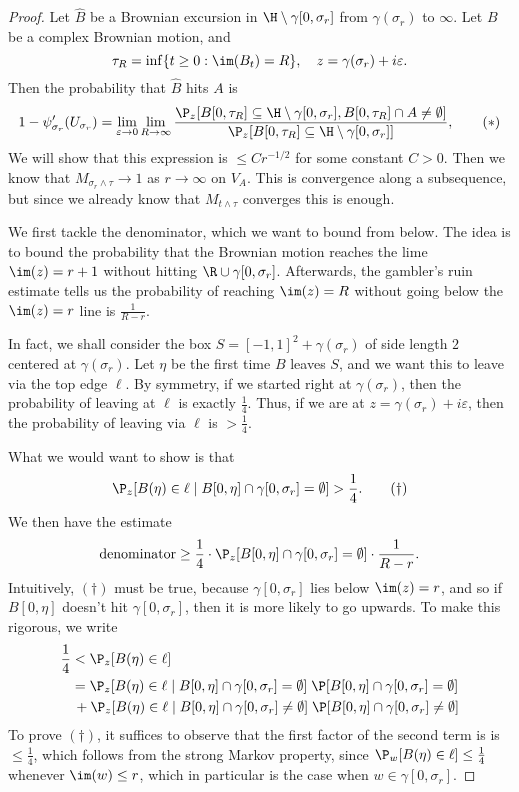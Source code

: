 \documentclass[a4paper]{article}
\begin{document}
\begin{proof}
  Let $\hat{B}$ be a Brownian excursion in $\H \setminus \gamma[0, \sigma_r]$ from $\gamma(\sigma_r)$ to $\infty$. Let $B$ be a complex Brownian motion, and
  \[
    \tau_R = \inf\{t \geq 0: \im(B_t) = R\},\quad z = \gamma(\sigma_r) + i\varepsilon.
  \]
  Then the probability that $\hat{B}$ hits $A$ is
  \[
    1 - \psi_{\sigma_r}'(U_{\sigma_r}) = \lim_{\varepsilon \to 0} \lim_{R \to \infty} \frac{\P_z [B[0, \tau_R] \subseteq \H \setminus \gamma[0, \sigma_r], B[0, \tau_R] \cap A \not= \emptyset]}{\P_z[B[0, \tau_R] \subseteq \H \setminus \gamma[0, \sigma_r]]},\tag{$*$}
  \]
  We will show that this expression is $\leq C r^{-1/2}$ for some constant $C > 0$. Then we know that $M_{\sigma_r \wedge \tau} \to 1$ as $r \to \infty$ on $V_A$. This is convergence along a subsequence, but since we already know that $M_{t \wedge \tau}$ converges this is enough.

  We first tackle the denominator, which we want to bound from below. The idea is to bound the probability that the Brownian motion reaches the lime $\im(z) = r + 1$ without hitting $\R \cup \gamma[0, \sigma_r]$. Afterwards, the gambler's ruin estimate tells us the probability of reaching $\im(z) = R$ without going below the $\im(z) = r$ line is $\frac{1}{R - r}$.

  In fact, we shall consider the box $S = [-1, 1]^2 + \gamma(\sigma_r)$ of side length $2$ centered at $\gamma(\sigma_r)$. Let $\eta$ be the first time $B$ leaves $S$, and we want this to leave via the top edge $\ell$. By symmetry, if we started right at $\gamma(\sigma_r)$, then the probability of leaving at $\ell$ is exactly $\frac{1}{4}$. Thus, if we are at $z = \gamma(\sigma_r) + i\varepsilon$, then the probability of leaving via $\ell$ is $> \frac{1}{4}$.

  What we would want to show is that
  \[
    \P_z[B(\eta) \in \ell \mid B[0, \eta] \cap \gamma[0, \sigma_r] = \emptyset] > \frac{1}{4}.\tag{$\dagger$}
  \]
  We then have the estimate
  \[
    \text{denominator} \geq \frac{1}{4}\cdot \P_z[B[0, \eta] \cap \gamma[0, \sigma_r] = \emptyset] \cdot \frac{1}{R - r}.
  \]
  Intuitively, $(\dagger)$ must be true, because $\gamma[0, \sigma_r]$ lies below $\im(z) = r$, and so if $B[0, \eta]$ doesn't hit $\gamma[0, \sigma_r]$, then it is more likely to go upwards. To make this rigorous, we write
  \begin{align*}
    \frac{1}{4} &< \P_z[B(\eta) \in \ell]\\
    &= \P_z[B(\eta) \in \ell \mid B[0, \eta] \cap \gamma[0, \sigma_r] = \emptyset]\; \P[B[0, \eta] \cap \gamma[0, \sigma_r] = \emptyset]\\
    &\,+\P_z[B(\eta) \in \ell \mid B[0, \eta] \cap \gamma[0, \sigma_r] \not= \emptyset]\;\P[ B[0, \eta] \cap \gamma[0, \sigma_r] \not= \emptyset]
  \end{align*}
  To prove $(\dagger)$, it suffices to observe that the first factor of the second term is is $\leq \frac{1}{4}$, which follows from the strong Markov property, since $\P_w[B(\eta) \in \ell] \leq \frac{1}{4}$ whenever $\im(w)\leq r$, which in particular is the case when $w \in \gamma[0, \sigma_r]$.


\end{proof}
\end{document}
